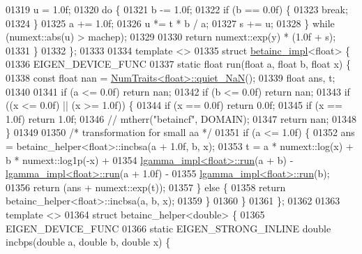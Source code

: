 \begin{DoxyCode}
01319     u = 1.0f;
01320     \textcolor{keywordflow}{do} \{
01321       b -= 1.0f;
01322       \textcolor{keywordflow}{if} (b == 0.0f) \{
01323         \textcolor{keywordflow}{break};
01324       \}
01325       a += 1.0f;
01326       u *= t * b / a;
01327       s += u;
01328     \} \textcolor{keywordflow}{while} (numext::abs(u) > machep);
01329 
01330     \textcolor{keywordflow}{return} numext::exp(y) * (1.0f + s);
01331   \}
01332 \};
01333 
01334 \textcolor{keyword}{template} <>
01335 \textcolor{keyword}{struct }\hyperlink{struct_eigen_1_1internal_1_1betainc__impl}{betainc\_impl}<float> \{
01336   EIGEN\_DEVICE\_FUNC
01337   \textcolor{keyword}{static} \textcolor{keywordtype}{float} run(\textcolor{keywordtype}{float} a, \textcolor{keywordtype}{float} b, \textcolor{keywordtype}{float} x) \{
01338     \textcolor{keyword}{const} \textcolor{keywordtype}{float} nan = \hyperlink{group___core___module_struct_eigen_1_1_num_traits}{NumTraits<float>::quiet\_NaN}();
01339     \textcolor{keywordtype}{float} ans, t;
01340 
01341     \textcolor{keywordflow}{if} (a <= 0.0f) \textcolor{keywordflow}{return} nan;
01342     \textcolor{keywordflow}{if} (b <= 0.0f) \textcolor{keywordflow}{return} nan;
01343     \textcolor{keywordflow}{if} ((x <= 0.0f) || (x >= 1.0f)) \{
01344       \textcolor{keywordflow}{if} (x == 0.0f) \textcolor{keywordflow}{return} 0.0f;
01345       \textcolor{keywordflow}{if} (x == 1.0f) \textcolor{keywordflow}{return} 1.0f;
01346       \textcolor{comment}{// mtherr("betaincf", DOMAIN);}
01347       \textcolor{keywordflow}{return} nan;
01348     \}
01349 
01350     \textcolor{comment}{/* transformation for small aa */}
01351     \textcolor{keywordflow}{if} (a <= 1.0f) \{
01352       ans = betainc\_helper<float>::incbsa(a + 1.0f, b, x);
01353       t = a * numext::log(x) + b * numext::log1p(-x) +
01354           \hyperlink{struct_eigen_1_1internal_1_1lgamma__impl}{lgamma\_impl<float>::run}(a + b) - 
      \hyperlink{struct_eigen_1_1internal_1_1lgamma__impl}{lgamma\_impl<float>::run}(a + 1.0f) -
01355           \hyperlink{struct_eigen_1_1internal_1_1lgamma__impl}{lgamma\_impl<float>::run}(b);
01356       \textcolor{keywordflow}{return} (ans + numext::exp(t));
01357     \} \textcolor{keywordflow}{else} \{
01358       \textcolor{keywordflow}{return} betainc\_helper<float>::incbsa(a, b, x);
01359     \}
01360   \}
01361 \};
01362 
01363 \textcolor{keyword}{template} <>
01364 \textcolor{keyword}{struct }betainc\_helper<double> \{
01365   EIGEN\_DEVICE\_FUNC
01366   \textcolor{keyword}{static} EIGEN\_STRONG\_INLINE \textcolor{keywordtype}{double} incbps(\textcolor{keywordtype}{double} a, \textcolor{keywordtype}{double} b, \textcolor{keywordtype}{double} x) \{

\end{DoxyCode}
